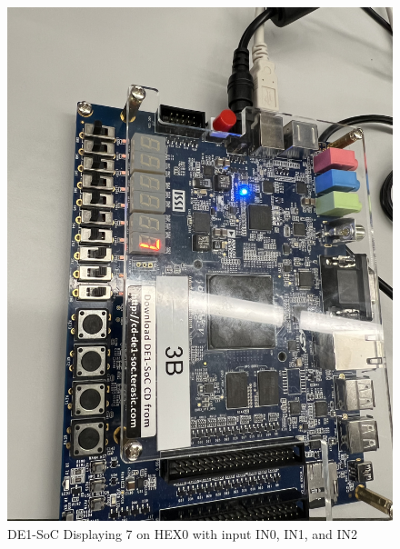 \documentclass[
	letterpaper, %
	10pt, %
]{CSUniSchoolLabReport}
\begin{document}
\begin{figure}[H]
  \centering
  \includegraphics[width=.9\textwidth]{Figures/Disp_7.jpg}
  \caption{DE1-SoC Displaying 7 on HEX0 with input IN0, IN1, and IN2}
  \label{fig:10}
\end{figure}
\end{document}
